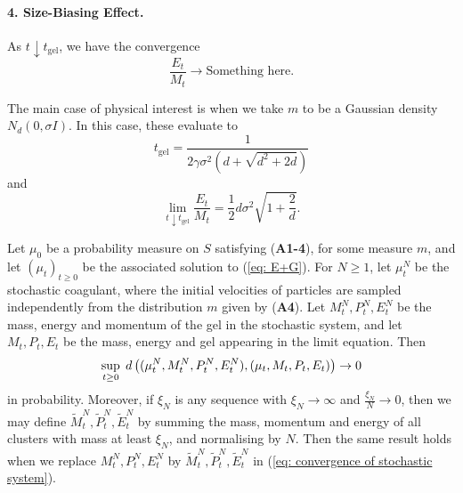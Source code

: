 \begin{theorem}
\paragraph{4. Size-Biasing Effect.} As $t\downarrow t_\text{gel}$, we have the convergence \begin{equation}
    \frac{E_t}{M_t}\rightarrow \text{Something here}.
\end{equation}


The main case of physical interest is when we take $m$ to be a Gaussian density $N_d(0, \sigma I)$. In this case, these evaluate to 
\begin{equation}
    \label{eq: formula of tgel} t_\text{gel} = \frac{1}{2\gamma \sigma^2(d+\sqrt{d^2+2d})}
\end{equation} and \begin{equation}
    \lim_{t\downarrow t_\text{gel}}\frac{E_t}{M_t}=\frac{1}{2}d\sigma^2\sqrt{1+\frac{2}{d}}.
\end{equation} \end{theorem}

\begin{theorem} \label{thrm: convergence of stochastic coagulent} Let $\mu_0$ be a probability measure on $S$ satisfying (\textbf{A1-4}), for some measure $m$, and let $(\mu_t)_{t\ge 0}$ be the associated solution to (\ref{eq: E+G}). For $N\ge 1$, let $\mu^N_t$ be the stochastic coagulant, where the initial velocities of particles are sampled independently from the distribution $m$ given by (\textbf{A4}). Let $M^N_t, P^N_t, E^N_t$ be the mass, energy and momentum of the gel in the stochastic system, and let $M_t, P_t, E_t$ be the mass, energy and gel appearing in the limit equation. Then \begin{equation} \label{eq: convergence of stochastic system}
    \sup_{t\ge 0}\hspace{0.1cm}d\left((\mu^N_t, M^N_t, P^N_t, E^N_t),(\mu_t, M_t, P_t, E_t)\right) \rightarrow 0
\end{equation} in probability. Moreover, if $\xi_N$ is any sequence with $\xi_N\rightarrow \infty$ and $\frac{\xi_N}{N}\rightarrow 0$, then we may define $\widetilde{M}^N_t, \widetilde{P}^N_t, \widetilde{E}^N_t$ by summing the mass, momentum and energy of all clusters with mass at least $\xi_N$, and normalising by $N$. Then the same result holds when we replace $M^N_t, P^N_t, E^N_t$ by $\widetilde{M}^N_t, \widetilde{P}^N_t, \widetilde{E}^N_t$ in (\ref{eq: convergence of stochastic system}).
\end{theorem}